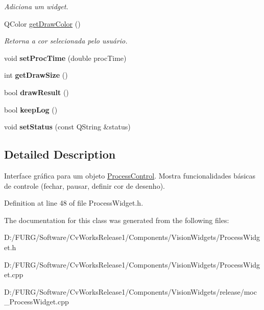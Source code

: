 \begin{DoxyCompactItemize}
\begin{DoxyCompactList}\small\item\em Adiciona um widget. \end{DoxyCompactList}\item 
\hypertarget{class_process_widget_ad4cdd61d9764dff1012e170ddd629f8f}{}Q\+Color \hyperlink{class_process_widget_ad4cdd61d9764dff1012e170ddd629f8f}{get\+Draw\+Color} ()\label{class_process_widget_ad4cdd61d9764dff1012e170ddd629f8f}

\begin{DoxyCompactList}\small\item\em Retorna a cor selecionada pelo usuário. \end{DoxyCompactList}\item 
\hypertarget{class_process_widget_aba6dfbd926a8cfa14801311918f0311f}{}void {\bfseries set\+Proc\+Time} (double proc\+Time)\label{class_process_widget_aba6dfbd926a8cfa14801311918f0311f}

\item 
\hypertarget{class_process_widget_a2dae1852230e4eaee29660022e8a6b2f}{}int {\bfseries get\+Draw\+Size} ()\label{class_process_widget_a2dae1852230e4eaee29660022e8a6b2f}

\item 
\hypertarget{class_process_widget_a269159408fa7a92a98ce8176daac9026}{}bool {\bfseries draw\+Result} ()\label{class_process_widget_a269159408fa7a92a98ce8176daac9026}

\item 
\hypertarget{class_process_widget_a83f780f55acecbb262ab1a2e111b097c}{}bool {\bfseries keep\+Log} ()\label{class_process_widget_a83f780f55acecbb262ab1a2e111b097c}

\item 
\hypertarget{class_process_widget_a1f47b0f6a1af3369f3feb1eabbe85543}{}void {\bfseries set\+Status} (const Q\+String \&status)\label{class_process_widget_a1f47b0f6a1af3369f3feb1eabbe85543}

\end{DoxyCompactItemize}


\subsection{Detailed Description}
Interface gráfica para um objeto \hyperlink{class_process_control}{Process\+Control}. Mostra funcionalidades básicas de controle (fechar, pausar, definir cor de desenho). 

Definition at line 48 of file Process\+Widget.\+h.



The documentation for this class was generated from the following files\+:\begin{DoxyCompactItemize}
\item 
D\+:/\+F\+U\+R\+G/\+Software/\+Cv\+Works\+Release1/\+Components/\+Vision\+Widgets/Process\+Widget.\+h\item 
D\+:/\+F\+U\+R\+G/\+Software/\+Cv\+Works\+Release1/\+Components/\+Vision\+Widgets/Process\+Widget.\+cpp\item 
D\+:/\+F\+U\+R\+G/\+Software/\+Cv\+Works\+Release1/\+Components/\+Vision\+Widgets/release/moc\+\_\+\+Process\+Widget.\+cpp\end{DoxyCompactItemize}

